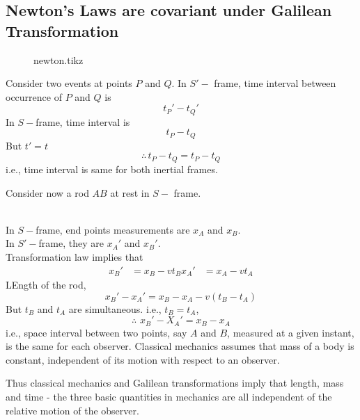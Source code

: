 \documentclass[../main-sheet.tex]{subfiles}
\begin{document}
\subsection{Newton's Laws are covariant under Galilean Transformation}
\begin{figure}[H]
    \centering
    {newton.tikz}
\end{figure}
Consider two events at points \(P \) and \(Q \). In \(S'-\) frame, time interval between occurrence of \(P \) and \(Q \) is 
\[t_P'-t_Q'\]
In \(S-\)frame, time interval is
\[t_P-t_Q\]
But \(t'=t\)
\[\therefore \,t_P-t_Q=t_P-t_Q\]
i.e., time interval is same for both inertial frames.

Consider now a rod \(AB \) at rest in \(S-\) frame.\hspace{3cm}\\
In \(S-\)frame, end points measurements are \(x_A \) and \(x_B \).\\
In \(S'-\)frame, they are \(x_A' \) and \(x_B' \).\\
Transformation law implies that
\begin{align*}
    x_B'&=x_B-vt_B
    x_A'&=x_A-vt_A
\end{align*}
LEngth of the rod,
\[x_B'-x_A'=x_B-x_A-v(t_B-t_A )\]
But \(t_B \) and \(t_A \) are simultaneous. i.e., \(t_B=t_A \),
\[\therefore\,\,x_B'-X_A'=x_B-x_A\]
i.e., space interval between two points, say \(A \) and \(B \), measured at a given instant, is the same for each observer. Classical mechanics assumes that mass of a body is constant, independent of its motion with respect to an observer.

Thus classical mechanics and Galilean transformations imply that length, mass and time - the three basic quantities in mechanics are all independent of the relative motion of the observer.
\end{document}
